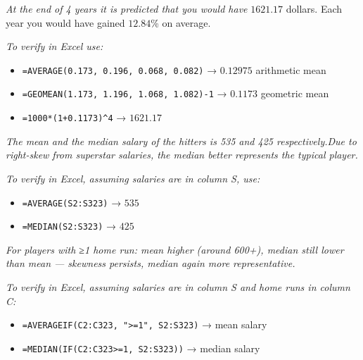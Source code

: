 \documentclass[
  11pt,
  letterpaper,
  DIV=11,
  numbers=noendperiod,
  oneside,
  open=any]{scrreprt}
\providecommand{\tightlist}{%
  \setlength{\itemsep}{0pt}\setlength{\parskip}{0pt}}\usepackage{longtable,booktabs,array}
\newenvironment{bsanswerkey}[2]{%
  \begin{tcolorbox}[bsbase, colback=bspaper2, colframe=bsline, fontupper=\small,
    title={\hypertarget{a-#1}{}\label{a-#1}\hyperlink{q-#1}{\textcolor{bsink2}{\MakeUppercase{#2}}}\hfill
      \hyperlink{q-#1}{\textcolor{bsaccent}{\normalfont\footnotesize back to page \pageref{q-#1}}}}]}%
  {\end{tcolorbox}}
\begin{document}
\begin{bsanswerkey}{bsans28}{Exercise 5}

\emph{At the end of 4 years it is predicted that you would have}
\(1621.17\) dollars. Each year you would have gained \(12.84\)\% on
average.

\emph{To verify in Excel use:}

\begin{itemize}
\tightlist
\item
  \texttt{=AVERAGE(0.173,\ 0.196,\ 0.068,\ 0.082)} → \(0.12975\)
  arithmetic mean
\item
  \texttt{=GEOMEAN(1.173,\ 1.196,\ 1.068,\ 1.082)-1} → \(0.1173\)
  geometric mean
\item
  \texttt{=1000*(1+0.1173)\^{}4} → \(1621.17\)
\end{itemize}

\end{bsanswerkey}

\begin{bsanswerkey}{bsans29}{Exercise 6, question 1}

\emph{The mean and the median salary of the hitters is 535 and 425
respectively.Due to right-skew from superstar salaries, the median
better represents the typical player.}

\emph{To verify in Excel, assuming salaries are in column S, use:}

\begin{itemize}
\tightlist
\item
  \texttt{=AVERAGE(S2:S323)} → \(535\)
\item
  \texttt{=MEDIAN(S2:S323)} → \(425\)
\end{itemize}

\end{bsanswerkey}

\begin{bsanswerkey}{bsans30}{Exercise 6, question 2}

\emph{For players with ≥1 home run: mean higher (around 600+), median
still lower than mean --- skewness persists, median again more
representative.}

\emph{To verify in Excel, assuming salaries are in column S and home
runs in column C:}

\begin{itemize}
\tightlist
\item
  \texttt{=AVERAGEIF(C2:C323,\ "\textgreater{}=1",\ S2:S323)} → mean
  salary
\item
  \texttt{=MEDIAN(IF(C2:C323\textgreater{}=1,\ S2:S323))} → median
  salary
\end{itemize}

\end{bsanswerkey}
\end{document}
